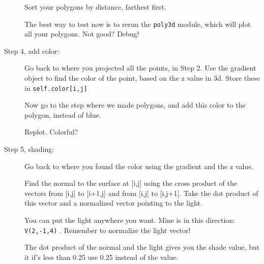 \documentclass[12pt]{article}
\begin{document}
\begin{description}
Sort your polygons by distance, farthest first.

The best way to test now is to rerun the \lstinline{poly3d}
module, which will plot all your polygons.  Not good?  Debug!

\item[Step 4, add color:] Go back to where you projected all the
points, in Step  2.  Use the gradient object to find the color
of the point, based on the z value in 3d.  Store these in
\lstinline{self.color[i,j]}  

Now go to the step where we made polygons, and 
add this color to the polygon, instead of blue.

Replot. Colorful?

\item[Step 5, shading:] Go back to where you
found the color using the gradient and the z value.

Find the normal to the surface at [i,j] using the cross
product of the vectors from [i,j] to [i+1,j] and from [i,j] to [i,j+1].
Take the dot product of this vector
and a normalized vector pointing to the light.

You can put the light anywhere you want.  Mine is in
this direction: \lstinline{V(2,-1,4)} .  Remember to normalize
the light vector!

The dot product of the normal and the light gives you the shade value,
but it if's less than 0.25 use 0.25 instead of the value.  

\end{description}
\end{document}

